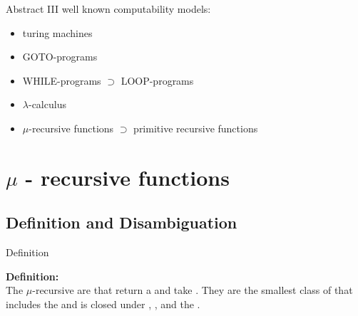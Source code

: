 \documentclass[]{beamer}
\begin{document}
\begin{frame}{Abstract III}
well known computability models:
\begin{itemize}[<+->]
\item{turing machines}
\item{GOTO-programs}
\item{WHILE-programs}	\hspace{0.4cm}	$\supset$ LOOP-programs
\item{$\lambda$-calculus}
\item{\alert{$\mu$-recursive functions}} $\supset$ primitive recursive functions
\end{itemize}
\end{frame}

\section{$\mu$ - recursive functions}
\subsection{Definition and Disambiguation}

\begin{frame}{Definition}
\begin{center}
\textbf{Definition:}\\
The $\mu$-recursive
 are
 that return a
 and take
. They are the smallest class of
 that includes the
 and is closed under
,
, and the
.
\end{center}
\end{frame}
\end{document}
